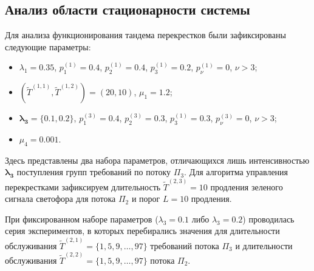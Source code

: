 \documentclass{report}
\begin{document}
\subsection{Анализ области стационарности системы}
Для анализа функционирования тандема перекрестков были зафиксированы следующие параметры:
\begin{itemize}
    \item $\lambda_1=0.35$, $p_{1}^{(1)}=0.4$, $p_{2}^{(1)}=0.4$, $p_{3}^{(1)}=0.2$, $p_{\nu}^{(1)}=0$, $\nu > 3$;
    \item $(\widetilde{T}^{(1,1)}, \widetilde{T}^{(1,2)})=(20,10)$, $\mu_1 = 1.2$;
    \item $\boldsymbol{ \lambda_3=\{0.1, 0.2\}}$, $p_{1}^{(3)}=0.4$, $p_{2}^{(3)}=0.3$, $p_{3}^{(1)}=0.3$, $p_{\nu}^{(3)}=0$, $\nu > 3$;
        \item $\mu_4= 0.001$.
\end{itemize}
Здесь представлены два набора параметров, отличающихся лишь интенсивностью $\boldsymbol{\lambda_3}$ поступления групп требований по потоку $\Pi_3$. Для алгоритма управления перекрестками зафиксируем длительность $\widetilde{T}^{(2,3)}=10$ продления зеленого сигнала светофора для потока $\Pi_2$ и порог $L=10$ продления.

При фиксированном наборе параметров ($\lambda_3 = 0.1$ либо $\lambda_3=0.2$) проводилась серия экспериментов, в которых перебирались значения для длительности обслуживания  $\widetilde{T}^{(2,1)} = \{1, 5, 9, \ldots, 97\}$ требований потока $\Pi_3$ и длительности обслуживания $\widetilde{T}^{(2,2)} = \{1, 5, 9, \ldots, 97\}$ потока $\Pi_2$.
\end{document}
